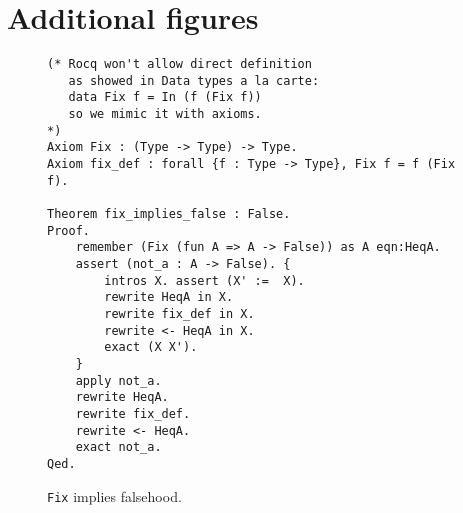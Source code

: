 \documentclass[sigplan,nonacm]{acmart}
\begin{document}



\appendix

\section{Additional figures}

\begin{figure}[H]
\begin{lstlisting}[language=Coq]
(* Rocq won't allow direct definition
   as showed in Data types a la carte:
   data Fix f = In (f (Fix f))
   so we mimic it with axioms.
*)
Axiom Fix : (Type -> Type) -> Type.
Axiom fix_def : forall {f : Type -> Type}, Fix f = f (Fix f).

Theorem fix_implies_false : False. 
Proof.
    remember (Fix (fun A => A -> False)) as A eqn:HeqA.
    assert (not_a : A -> False). { 
        intros X. assert (X' :=  X).
        rewrite HeqA in X.
        rewrite fix_def in X.
        rewrite <- HeqA in X.
        exact (X X').
    }
    apply not_a.
    rewrite HeqA.
    rewrite fix_def.
    rewrite <- HeqA.
    exact not_a.
Qed.
\end{lstlisting}
\caption{\texttt{Fix} implies falsehood.}
  \label{appendix:false_proof}
\end{figure}
\end{document}
